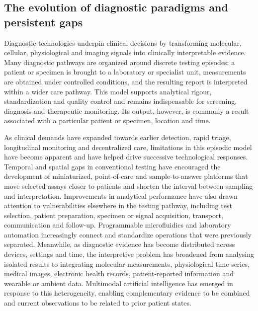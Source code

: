 \documentclass[12pt,a4paper]{article}
\begin{document}
\subsection{The evolution of diagnostic paradigms and persistent gaps}
\label{subsec:evolution_medical_detection}

Diagnostic technologies underpin clinical decisions by transforming molecular, cellular, physiological and imaging signals into clinically interpretable evidence. Many diagnostic pathways are organized around discrete testing episodes: a patient or specimen is brought to a laboratory or specialist unit, measurements are obtained under controlled conditions, and the resulting report is interpreted within a wider care pathway. This model supports analytical rigour, standardization and quality control and remains indispensable for screening, diagnosis and therapeutic monitoring. Its output, however, is commonly a result associated with a particular patient or specimen, location and time.

As clinical demands have expanded towards earlier detection, rapid triage, longitudinal monitoring and decentralized care, limitations in this episodic model have become apparent and have helped drive successive technological responses. Temporal and spatial gaps in conventional testing have encouraged the development of miniaturized, point-of-care and sample-to-answer platforms that move selected assays closer to patients and shorten the interval between sampling and interpretation. Improvements in analytical performance have also drawn attention to vulnerabilities elsewhere in the testing pathway, including test selection, patient preparation, specimen or signal acquisition, transport, communication and follow-up. Programmable microfluidics and laboratory automation increasingly connect and standardize operations that were previously separated. Meanwhile, as diagnostic evidence has become distributed across devices, settings and time, the interpretive problem has broadened from analysing isolated results to integrating molecular measurements, physiological time series, medical images, electronic health records, patient-reported information and wearable or ambient data. Multimodal artificial intelligence has emerged in response to this heterogeneity, enabling complementary evidence to be combined and current observations to be related to prior patient states.
\end{document}

